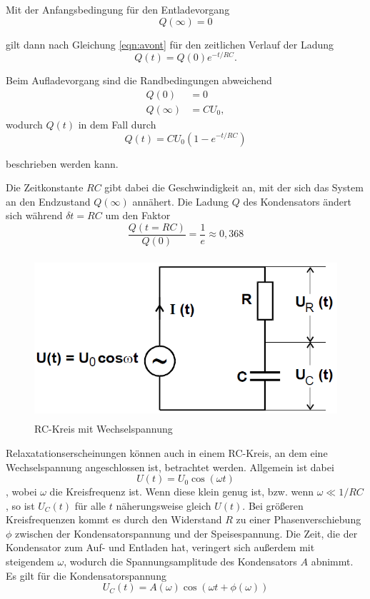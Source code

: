 Mit der Anfangsbedingung für den Entladevorgang
\begin{equation}
    Q(\infty) = 0
\end{equation}

gilt dann nach Gleichung \ref{eqn:avont} für den zeitlichen Verlauf der Ladung
\begin{equation}
    Q(t) = Q(0) e^{-t/{RC}}.
\end{equation}

Beim Aufladevorgang sind die Randbedingungen abweichend
\begin{align*}
    Q(0)        &= 0 \\
    Q(\infty)   &= CU_0 ,
\end{align*} wodurch $Q(t)$ in dem Fall durch
\begin{equation}
    Q(t) = CU_0 (1 - e^{-t/{RC}})
    \label{eqn:RC}
\end{equation}

beschrieben werden kann.

Die Zeitkonstante $RC$ gibt dabei die Geschwindigkeit an, mit der sich das System 
an den Endzustand $Q(\infty)$ annähert. Die Ladung $Q$ des Kondensators ändert sich während $\delta t=RC$ um
den Faktor
\begin{equation*}
    \frac{Q(t=RC)}{Q(0)} = \frac{1}e \approx 0,368 
\end{equation*} 


\begin{figure}
    \centering
    \includegraphics[height=6cm]{data/bild_2}
    \caption{RC-Kreis mit Wechselspannung}
    \label{fig:bild_2}
\end{figure}
\FloatBarrier
Relaxatationserscheinungen können auch in einem RC-Kreis, an dem eine Wechselspannung angeschlossen ist, betrachtet werden. 
Allgemein ist dabei \begin{equation}
    U(t) = U_0 \cos(\omega t)
\end{equation}, wobei $\omega$ die Kreisfrequenz ist. Wenn diese klein genug ist, bzw. wenn $\omega \ll 1/RC$, so ist $U_C (t)$
für alle $t$ näherungsweise gleich $U(t)$. Bei größeren Kreisfrequenzen kommt es durch den Widerstand $R$ zu einer Phasenverschiebung
$\phi$ zwischen der Kondensatorspannung und der Speisespannung. Die Zeit, die der Kondensator zum Auf- und Entladen hat, veringert sich 
außerdem mit steigendem $\omega$, wodurch die Spannungsamplitude des Kondensators $A$ abnimmt. Es gilt für die Kondensatorspannung 
\begin{equation}
    U_C (t) = A(\omega) \cos(\omega t + \phi(\omega))
\end{equation}

